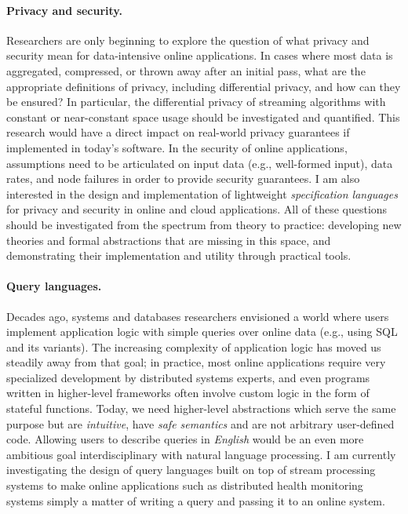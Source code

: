 \paragraph*{Privacy and security.}
Researchers are only beginning to explore the question of what privacy and security mean for data-intensive online applications.
In cases where most data is aggregated, compressed, or thrown away after an initial pass, what are the appropriate definitions of privacy, including differential privacy, and how can they be ensured?
In particular, the differential privacy of streaming algorithms with constant or near-constant space usage should be investigated and quantified.
This research would have a direct impact on real-world privacy guarantees if implemented in today's software.
In the security of online applications, assumptions need to be articulated on input data (e.g., well-formed input), data rates, and node failures in order to provide security guarantees.
I am also interested in the design and implementation of lightweight \emph{specification languages} for privacy and security in online and cloud applications.
All of these questions should be investigated from the spectrum from theory to practice: developing new theories and formal abstractions that are missing in this space, and demonstrating their implementation and utility through practical tools.

\paragraph*{Query languages.}
Decades ago, systems and databases researchers envisioned a world where users implement application logic with simple queries over online data (e.g., using SQL and its variants). The increasing complexity of application logic has moved us steadily away from that goal; in practice, most online applications require very specialized development by distributed systems experts, and even programs written in higher-level frameworks often involve custom logic in the form of stateful functions. Today, we need higher-level abstractions which serve the same purpose but are \emph{intuitive}, have \emph{safe semantics} and are not arbitrary user-defined code.
Allowing users to describe queries in \emph{English} would be an even more ambitious goal interdisciplinary with natural language processing.
I am currently investigating the design of query languages built on top of stream processing systems to make online applications such as distributed health monitoring systems
simply a matter of writing a query and passing it to an online system.
